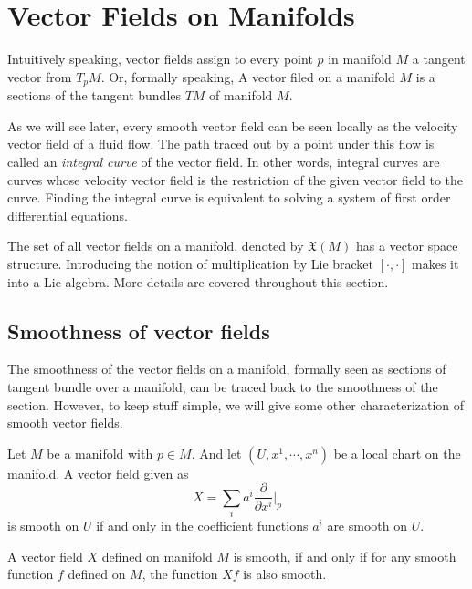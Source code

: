 \section{Vector Fields on Manifolds}
Intuitively speaking, vector fields assign to every point $ p $ in manifold $ M $ a tangent vector from $ T_pM $. Or, formally speaking, A vector filed on a manifold $ M $ is a sections of the tangent bundles $ TM $ of manifold $ M $.

As we will see later, every smooth vector field can be seen locally as the velocity vector field of a fluid flow. The path traced out by a point under this flow is called an \emph{integral curve} of the vector field. In other words, integral curves are curves whose velocity vector field is the restriction of the given vector field to the curve. Finding the integral curve is equivalent to solving a system of first order differential equations.

The set of all vector fields on a manifold, denoted by $ \mathfrak{X}(M) $ has a vector space structure. Introducing the notion of multiplication by Lie bracket $ [\cdot,\cdot] $ makes it into a Lie algebra. More details are covered throughout this section.

\subsection{Smoothness of vector fields}
The smoothness of the vector fields on a manifold, formally seen as sections of tangent bundle over a manifold, can be traced back to the smoothness of the section. However, to keep stuff simple, we will give some other characterization of smooth vector fields.

\begin{proposition}
	Let $ M $ be a manifold with $ p \in M $. And let $ (U,x^1,\cdots,x^n) $ be a local chart on the manifold. A vector field given as
	\[ X = \sum_i a^i \frac{\partial}{\partial  x^i}\big|_{p} \] 
	is smooth on $ U $ if and only in the coefficient functions $ a^i $ are smooth on $ U $.
\end{proposition}

\begin{proposition}
	\label{prop:smoothnessOfVectorFieldInTermsOfFunctions}
	A vector field $ X $ defined on manifold $ M $ is smooth, if and only if for any smooth function $ f $ defined on $ M $, the function $ Xf $ is also smooth.
\end{proposition}

